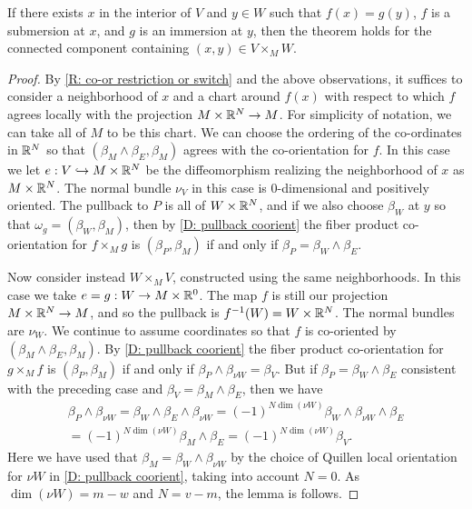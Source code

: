 \begin{lemma}\label{L: im/sub}
If there exists $x$ in the interior of $V$ and $y\in W$ such that  $f(x)=g(y)$, $f$ is a submersion at $x$, and $g$ is an immersion at $y$, then the theorem holds for the connected component containing $(x,y)\in V\times_MW$. 
\end{lemma}
\begin{proof}
By \cref{R: co-or restriction or switch} and the above observations, it suffices to consider a neighborhood of $x$ and a chart around $f(x)$ with respect to which $f$ agrees locally with the projection $M\times \mathbb{R}^N\to M$. For simplicity of notation, we can take all of $M$ to be this chart. We can choose the ordering of the co-ordinates in $\mathbb{R}^N$ so that $(\beta_M\wedge \beta_E,\beta_M)$ agrees with the co-orientation for $f$. In this case we let $e:V\hookrightarrow M\times \mathbb{R}^N$ be the diffeomorphism realizing the neighborhood of $x$ as $M\times \mathbb{R}^N$. The normal bundle $\nu_V$ in this case is $0$-dimensional and positively oriented. 
The pullback to $P$ is all of $W\times \mathbb{R}^N$, and if we also choose $\beta_W$ at $y$ so that $\omega_g=(\beta_W,\beta_M)$, then by \cref{D: pullback coorient} the fiber product  co-orientation for $f\times_Mg$ is $(\beta_P,\beta_M)$ if and only if $\beta_P=\beta_W\wedge \beta_E$.

Now consider instead $W\times_MV$, constructed using the same neighborhoods. In this case we take  $e=g:W\to M\times \mathbb{R}^0$. The map $f$ is still our projection $M\times \mathbb{R}^N\to M$, and so the pullback is $f^{-1}(W)=W\times \mathbb{R}^N$. The normal bundles are $\nu_W$. We continue to assume coordinates so that $f$ is co-oriented by $(\beta_M\wedge \beta_E, \beta_M)$. 
By \cref{D: pullback coorient} the fiber product  co-orientation for $g\times_Mf$ is $(\beta_P,\beta_M)$ if and only if $\beta_P\wedge \beta_{\nu W} =\beta_V$. But if $\beta_P=\beta_W\wedge \beta_E$ consistent with the preceding case and $\beta_V=\beta_M\wedge \beta_E$, then we have 
\begin{multline*}\beta_P\wedge \beta_{\nu W}=\beta_W\wedge \beta_E\wedge \beta_{\nu W}=(-1)^{N\dim(\nu W)}\beta_W\wedge \beta_{\nu W}\wedge \beta_E\\=(-1)^{N\dim(\nu W)}\beta_M\wedge \beta_E=(-1)^{N\dim(\nu W)}\beta_V.\end{multline*}
Here we have used that $\beta_M=\beta_W\wedge \beta_{\nu W}$ by the choice of Quillen local orientation for $\nu W$ in \cref{D: pullback coorient}, taking into account $N=0$. 
As $\dim(\nu W)=m-w$ and $N=v-m$, the lemma is follows.
\end{proof}


